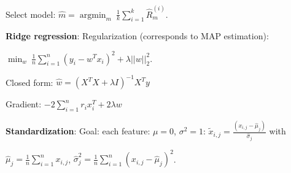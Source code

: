 Select model:  $\hat{m} =  \operatorname{argmin}_m\ \frac{1}{k} \sum_{i=1}^k \hat{R}_m^{(i)}$.

\textbf{Ridge regression}: Regularization (corresponds to MAP estimation): 

$\min_w\ \frac{1}{n} \sum_{i=1}^n (y_i - w^Tx_i)^2 + \lambda ||w||_2^2$.

Closed form: $\hat{w} =(X^T X + \lambda I)^{-1} X^T y$

Gradient: $-2 \sum_{i=1}^n r_i x_i^T + 2 \lambda w$

\textbf{Standardization}: Goal: each feature: $\mu = 0$, $\sigma^2 = 1$: $\tilde{x}_{i,j} = \frac{(x_{i,j}-\hat{\mu}_j)}{\hat{\sigma}_j}$ with 

$\hat{\mu}_j = \frac{1}{n}\sum_{i=1}^n x_{i,j}$, $\hat{\sigma}_j^2 = \frac{1}{n}\sum_{i=1}^n {(x_{i,j}-\hat{\mu}_j)}^2$.
